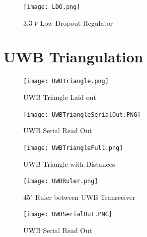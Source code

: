 \documentclass{report}
\begin{document}
    \begin{figure}[ht!]
      \begin{center}
          \texttt{[image: LDO.png]}\\
          \caption{ $3.3~V$ Low Dropout Regulator } 
          \label{fig:LDO}
      \end{center}
    \end{figure}

    \newpage

    \section{UWB Triangulation}

    \begin{figure}[ht!]
      \centering
      \begin{minipage}[b]{0.45\linewidth}
        \centering
        \texttt{[image: UWBTriangle.png]}
        \caption{UWB Triangle Laid out}
        \label{fig:UWBTriangle}
      \end{minipage}
      \hfill
      \begin{minipage}[b]{0.45\linewidth}
        \centering
        \texttt{[image: UWBTriangleSerialOut.PNG]}
        \caption{UWB Serial Read Out}
        \label{fig:UWBTriangleSerialOut}
      \end{minipage}
    \end{figure}

    \begin{figure}[ht!]
      \begin{center}
          \texttt{[image: UWBTriangleFull.png]}\\
          \caption{ UWB Triangle with Distances } 
          \label{fig:UWBTriangleFull}
      \end{center}
    \end{figure}

    \begin{figure}[ht!]
      \centering
      \begin{minipage}[b]{0.45\linewidth}
        \centering
        \texttt{[image: UWBRuler.png]}
        \caption{45" Ruler between UWB Transceiver}
        \label{fig:UWBRuler}
      \end{minipage}
      \hfill
      \begin{minipage}[b]{0.3\linewidth}
        \centering
        \texttt{[image: UWBSerialOut.PNG]}
        \caption{UWB Serial Read Out}
        \label{fig:UWBSerialOut}
      \end{minipage}
    \end{figure}
\end{document}
